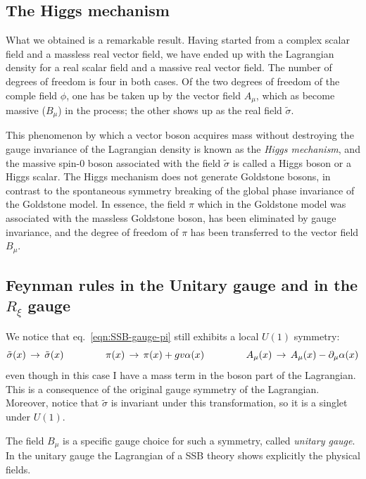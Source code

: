 \documentclass[TheoreticalPhy_ModB.tex]{subfiles}
\begin{document}
\subsection{The Higgs mechanism}

What we obtained is a remarkable result. Having started from a complex scalar field and a massless real vector field, we have ended up with the Lagrangian density for a real scalar field and a massive real vector field. The number of degrees of freedom is four in both cases. Of the two degrees of freedom of the comple field $\phi$, one has be taken up by the vector field $A_\mu$, which as become massive ($B_\mu$) in the process; the other shows up as the real field $\tilde\sigma$. 

This phenomenon by which a vector boson acquires mass without destroying the gauge invariance of the Lagrangian density is known as the \emph{Higgs mechanism}, and the massive spin-0 boson associated with the field $\tilde\sigma$ is called a Higgs boson or a Higgs scalar. The Higgs mechanism does not generate Goldstone bosons, in contrast to the spontaneous symmetry breaking of the global phase invariance of the Goldstone model. In essence, the field $\pi$ which in the Goldstone model was associated with the massless Goldstone boson, has been eliminated by gauge invariance, and the degree of freedom of $\pi$ has been transferred to the vector field $B_\mu$. 

\subsection{Feynman rules in the Unitary gauge and in the $R_\xi$ gauge}

We notice that eq.~\eqref{eqn:SSB-gauge-pi} still exhibits a local $U(1)$ symmetry:
\[\tilde\sigma(x)\,\to\,\tilde\sigma(x)\hspace{1.5cm}\pi(x)\,\to\,\pi(x)+gv\alpha(x)\hspace{1.5cm}A_\mu(x)\,\to\,A_\mu(x)-\partial_\mu\alpha(x)\]
even though in this case I have a mass term in the boson part of the Lagrangian. This is a consequence of the original gauge symmetry of the Lagrangian. Moreover, notice that $\tilde\sigma$ is invariant under this transformation, so it is a singlet under $U(1)$. 

The field $B_\mu$ is a specific gauge choice for such a symmetry, called \emph{unitary gauge}. In the unitary gauge the Lagrangian of a SSB theory shows explicitly the physical fields. 
\end{document}
